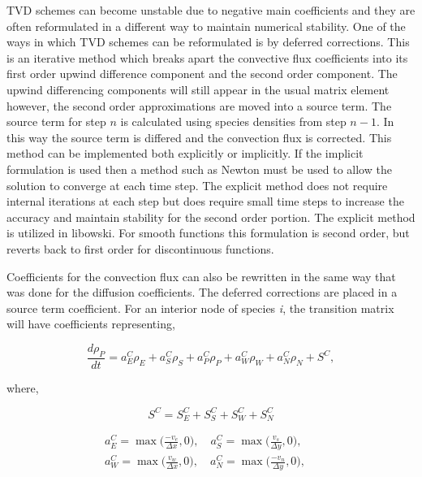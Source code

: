 TVD schemes can become unstable due to negative main coefficients and they are often reformulated in a different way to maintain numerical stability. One of the ways in which TVD schemes can be reformulated is by deferred corrections. This is an iterative method which breaks apart the convective flux coefficients into its first order upwind difference component and the second order component. The upwind differencing components will still appear in the usual matrix element however, the second order approximations are moved into a source term. The source term for step $n$ is calculated using species densities from step $n-1$. In this way the source term is differed and the convection flux is corrected. This method can be implemented both explicitly or implicitly. If the implicit formulation is used then a method such as Newton must be used to allow the solution to converge at each time step. The explicit method does not require internal iterations at each step but does require small time steps to increase the accuracy and maintain stability for the second order portion. The explicit method is utilized in libowski. For smooth functions this formulation is second order, but reverts back to first order for discontinuous functions.  

Coefficients for the convection flux can also be rewritten in the same way that was done for the diffusion coefficients. The deferred corrections are placed in a source term coefficient. For an interior node of species \textit{i}, the transition matrix will have coefficients representing,

\begin{equation}
    \frac{d \rho_{P}}{dt} = a^{C}_{E}\rho_{E} + a^{C}_{S}\rho_{S} + a^{C}_{P}\rho_{P} + a^{C}_{W}\rho_{W} + a^{C}_{N}\rho_{N} + S^{C},
\end{equation}

\noindent where,

\begin{equation*}
    S^{C} = S_{E}^{C} + S_{S}^{C} + S_{W}^{C} + S_{N}^{C}
\end{equation*}

\begin{equation*}
\begin{split}
    a^{C}_{E} = \max\bigg(\frac{-v_{e}}{\Delta x}, 0\bigg), \quad 
    a^{C}_{S} = \max\bigg(\frac{v_{s}}{\Delta y}, 0\bigg), \quad \\
    a^{C}_{W} = \max\bigg(\frac{v_{w}}{\Delta x}, 0\bigg), \quad
    a^{C}_{N} = \max\bigg(\frac{-v_{n}}{\Delta y}, 0\bigg), \quad 
\end{split}
\end{equation*}

